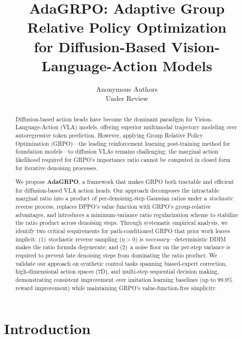 \documentclass{article}
\title{AdaGRPO: Adaptive Group Relative Policy Optimization\\for Diffusion-Based Vision-Language-Action Models}
\author{Anonymous Authors \\ Under Review}
\date{}
\begin{document}
\maketitle

\begin{abstract}
Diffusion-based action heads have become the dominant paradigm for Vision-Language-Action (VLA) models, offering superior multimodal trajectory modeling over autoregressive token prediction.
However, applying Group Relative Policy Optimization (GRPO)---the leading reinforcement learning post-training method for foundation models---to diffusion VLAs remains challenging: the marginal action likelihood required for GRPO's importance ratio cannot be computed in closed form for iterative denoising processes.

We propose \textbf{AdaGRPO}, a framework that makes GRPO both tractable and efficient for diffusion-based VLA action heads.
Our approach decomposes the intractable marginal ratio into a product of per-denoising-step Gaussian ratios under a \emph{stochastic} reverse process, replaces DPPO's value function with GRPO's group-relative advantages, and introduces a minimum-variance ratio regularization scheme to stabilize the ratio product across denoising steps.
Through systematic empirical analysis, we identify two critical requirements for path-conditioned GRPO that prior work leaves implicit: (1)~stochastic reverse sampling (\(\eta > 0\)) is \emph{necessary}---deterministic DDIM makes the ratio formula degenerate; and (2)~a noise floor on the per-step variance is required to prevent late denoising steps from dominating the ratio product.
We validate our approach on synthetic control tasks spanning biased-expert correction, high-dimensional action spaces (7D), and multi-step sequential decision making, demonstrating consistent improvement over imitation learning baselines (up to 99.9\% reward improvement) while maintaining GRPO's value-function-free simplicity.

\end{abstract}


\section{Introduction}
\label{sec:intro}
\end{document}

